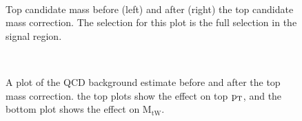 \begin{figure}[Htcb]
\centering
{}\\
\caption{Top candidate mass before (left) and after (right) the top candidate mass correction.  The selection for this plot is the full selection in the signal region.}
\label{figs:bsdatatmass}
\end{figure}

\begin{figure}[Htcb]
\centering
{}\\
\caption{A plot of the QCD background estimate before and after the top mass correction.  the top plots show the effect on top $\mathrm{p_{T}}$, and the bottom plot shows the effect on $\mathrm{M_{tW}}$.}
\label{figs:bsmodmasseffect}
\end{figure}





